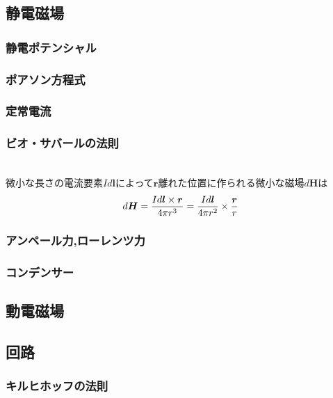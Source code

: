 \documentclass[dvipdfmx,uplatex]{jsarticle}
\begin{document}
\subsection{静電磁場}

\subsubsection{静電ポテンシャル}

\subsubsection{ポアソン方程式}

\subsubsection{定常電流}

\subsubsection{ビオ・サバールの法則}
\begin{theo}[ビオ・サバールの法則] \mbox{} \\
微小な長さの電流要素$I d\bm{l} $によって$ \bm{r} $離れた位置に作られる微小な磁場$ d\bm{H} $は
\[
d\bm{H} = \frac{Id\bm{l} \times \bm{r}}{4 \pi r^3} = \frac{Id\bm{l}}{4 \pi r^2} \times \frac{\bm{r}}{r} \\
\]
\end{theo}

\subsubsection{アンペール力,ローレンツ力}

\subsubsection{コンデンサー}

\subsection{動電磁場}

\subsection{回路}

\subsubsection{キルヒホッフの法則}
\end{document}
